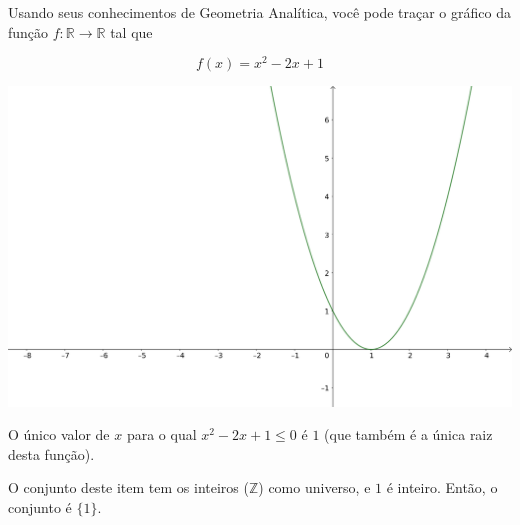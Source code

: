 \documentclass[
  letterpaper,
  DIV=11,
  numbers=noendperiod]{scrreprt}
\begin{document}
\begin{tcolorbox}[enhanced jigsaw, left=2mm, titlerule=0mm, colbacktitle=quarto-callout-important-color!10!white, title={Resposta (a)}, arc=.35mm, opacityback=0, bottomrule=.15mm, breakable, toprule=.15mm, colback=white, coltitle=black, bottomtitle=1mm, rightrule=.15mm, toptitle=1mm, leftrule=.75mm, colframe=quarto-callout-important-color-frame, opacitybacktitle=0.6]

Usando seus conhecimentos de Geometria Analítica, você pode traçar o
gráfico da função $f : \mathbb{R}\to \mathbb{R}$ tal que

\[
f(x) = x^2 - 2x + 1
\]

\includegraphics{images/ex-02.02-funcao.png}

O único valor de $x$ para o qual $x^2 - 2x + 1 \leq 0$ é $1$ (que também
é a única raiz desta função).

O conjunto deste item tem os inteiros ($\mathbb{Z}$) como universo, e
$1$ é inteiro. Então, o conjunto é $\{ 1 \}$.

\end{tcolorbox}
\end{document}
